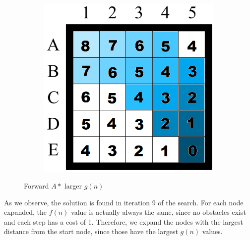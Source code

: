 \begin{figure}[H]
\begin{subfigure}[b]{.3\textwidth}
\end{subfigure}
\begin{subfigure}[b]{.3\textwidth}
  \centering
  \includegraphics[width=0.95\linewidth]{Report/Part2/g tie breaker/larger g/9.png}  
\end{subfigure}


\caption{Forward $A*$ larger $g(n)$}
\end{figure}

As we observe, the solution is found in iteration 9 of the search. For each node expanded, the $f(n)$ value is actually always the same, since no obstacles exist and each step has a cost of 1. Therefore, we expand the nodes with the largest distance from the start node, since those have the largest $g(n)$ values.


